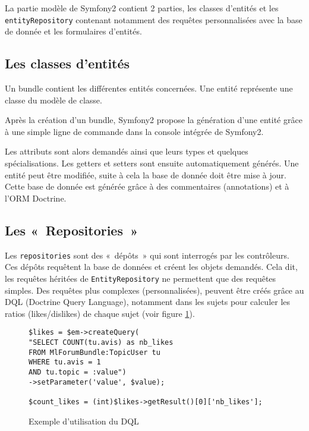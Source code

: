 La partie modèle de Symfony2 contient 2 parties, les classes d'entités et les \verb|entityRepository| contenant notamment des requêtes personnalisées avec la base de donnée et les formulaires d'entités.

\subsection{Les classes d'entités}
Un bundle contient les différentes entités concernées. Une entité représente une classe du modèle de classe.

Après la création d'un bundle, Symfony2 propose la génération d'une entité grâce à une simple ligne de commande dans la console intégrée de Symfony2.

Les attributs sont alors demandés ainsi que leurs types et quelques spécialisations. Les getters et setters sont ensuite automatiquement générés. Une entité peut être modifiée, suite à cela la base de donnée doit être mise à jour. Cette base de donnée est générée grâce à des commentaires (annotations) et à l'ORM Doctrine.

\subsection{Les «~Repositories~»}

Les \verb|repositories| sont des «~dépôts~» qui sont interrogés par les contrôleurs. Ces dépôts requêtent la base de données et créent les objets demandés. Cela dit, les requêtes héritées de \verb|EntityRepository| ne permettent que des requêtes simples.
Des requêtes plus complexes (personnalisées), peuvent être créés grâce au DQL (Doctrine Query Language), notamment dans les sujets pour calculer les ratios (likes/dislikes) de chaque sujet (voir figure \ref{fig:dql}).

\begin{figure}[h]
\centering
\begin{lstlisting}
$likes = $em->createQuery(
"SELECT COUNT(tu.avis) as nb_likes
FROM MlForumBundle:TopicUser tu
WHERE tu.avis = 1
AND tu.topic = :value")
->setParameter('value', $value);

$count_likes = (int)$likes->getResult()[0]['nb_likes'];
\end{lstlisting}
\caption{Exemple d'utilisation du DQL}
\label{fig:dql}
\end{figure}


